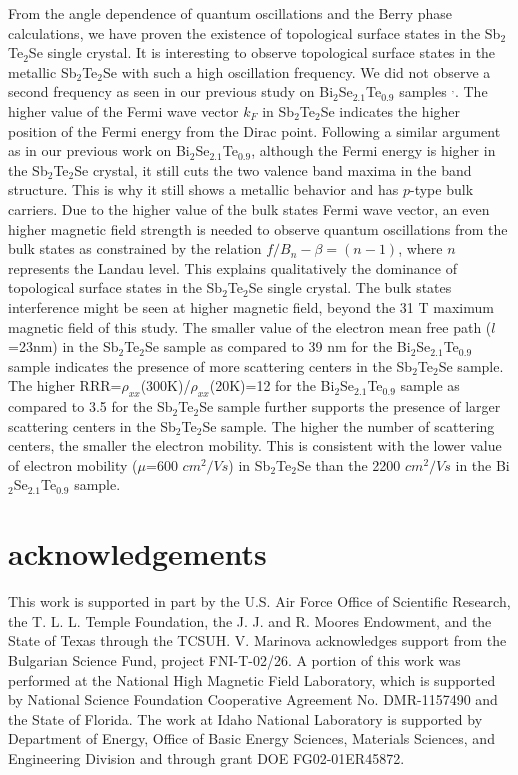 \documentclass[aps,prb,twocolumn,showpacs,groupedaddress]{revtex4-1}
\begin{document}
\indent From the angle dependence of quantum oscillations and the Berry phase calculations, we have proven the existence of topological surface states in the Sb$_2$Te$_2$Se single crystal. It is interesting to observe topological surface states in the metallic Sb$_2$Te$_2$Se with such a high oscillation frequency. We did not observe a second frequency as seen in our previous study on Bi$_{2}$Se$_{2.1}$Te$_{0.9}$ samples \cite{Shrestha:15}$^,$\cite{Shrestha1:16}. The higher value of the Fermi wave vector $k_{F}$ in Sb$_2$Te$_2$Se indicates the higher position of the Fermi energy from the Dirac point. Following a similar argument as in our previous work on Bi$_{2}$Se$_{2.1}$Te$_{0.9}$, although the Fermi energy is higher in the Sb$_2$Te$_2$Se crystal, it still cuts the two valence band maxima in the band structure. This is why it still shows a metallic behavior and has $p$-type bulk carriers. Due to the higher value of the bulk states Fermi wave vector, an even higher magnetic field strength is needed to observe quantum oscillations from the bulk states as constrained by the relation $f/B_{n} -\beta =(n-1)$, where $n$ represents the Landau level. This explains qualitatively the dominance of topological surface states in the Sb$_2$Te$_2$Se single crystal. The bulk states interference might be seen at higher magnetic field, beyond the 31 T maximum magnetic field of this study. The smaller value of the electron mean free path ($l$=23nm) in the Sb$_2$Te$_2$Se sample as compared to 39 nm for the Bi$_{2}$Se$_{2.1}$Te$_{0.9}$ sample indicates the presence of more scattering centers in the Sb$_2$Te$_2$Se sample. The higher RRR=$\rho_{xx}$(300K)/$\rho_{xx}$(20K)=12 for the Bi$_{2}$Se$_{2.1}$Te$_{0.9}$ sample as compared to 3.5 for the Sb$_2$Te$_2$Se sample further supports the presence of larger scattering centers in the Sb$_2$Te$_2$Se sample. The higher the number of scattering centers, the smaller the electron mobility. This is consistent with the lower value of electron mobility ($\mu$=600 $cm^2/V s$) in Sb$_2$Te$_2$Se than the 2200 $cm^2/V s$ in the Bi$_{2}$Se$_{2.1}$Te$_{0.9}$ sample.

\section*{acknowledgements}
This work is supported in part by the U.S. Air Force Office
of Scientific Research, the T. L. L. Temple Foundation, the J. J. and R. Moores Endowment, and the State of Texas through the TCSUH. V. Marinova acknowledges support from the Bulgarian Science Fund, project FNI-T-02/26. A portion of this work was performed at the National High Magnetic Field Laboratory, which is supported by National Science Foundation Cooperative Agreement No. DMR-1157490 and the State of Florida. The work at Idaho National Laboratory is supported by Department of Energy, Office of Basic Energy Sciences, Materials Sciences, and Engineering Division and through grant DOE FG02-01ER45872.


\end{document}
